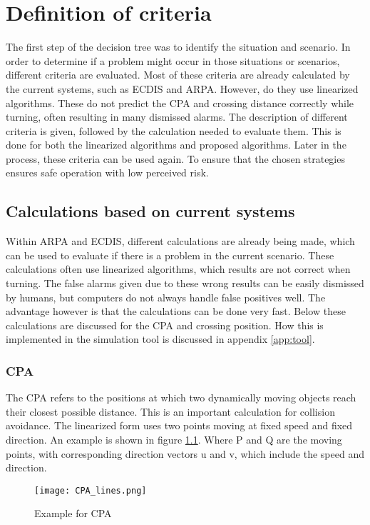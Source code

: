 \chapter{Definition of criteria}
\label{ch:criteria-problem}
The first step of the decision tree was to identify the situation and scenario. In order to determine if a problem might occur in those situations or scenarios, different criteria are evaluated. Most of these criteria are already calculated by the current systems, such as \ac{ECDIS} and \ac{ARPA}. However, do they use linearized algorithms. These do not predict the \ac{CPA} and crossing distance correctly while turning, often resulting in many dismissed alarms. The description of different criteria is given, followed by the calculation needed to evaluate them. This is done for both the linearized algorithms and proposed algorithms. Later in the process, these criteria can be used again. To ensure that the chosen strategies ensures safe operation with low perceived risk.

\section{Calculations based on current systems}
Within \ac{ARPA} and \ac{ECDIS}, different calculations are already being made, which can be used to evaluate if there is a problem in the current scenario. These calculations often use linearized algorithms, which results are not correct when turning. The false alarms given due to these wrong results can be easily dismissed by humans, but computers do not always handle false positives well. The advantage however is that the calculations can be done very fast. Below these calculations are discussed for the \acf{CPA} and crossing position. How this is implemented in the simulation tool is discussed in appendix \ref{app:tool}.

\subsection{\acf{CPA}}
The \ac{CPA} refers to the positions at which two dynamically moving objects reach their closest possible distance. This is an important calculation for collision avoidance. The linearized form uses two points moving at fixed speed and fixed direction. An example is shown in figure \ref{fig:CPA}. Where P and Q are the moving points, with corresponding direction vectors u and v, which include the speed and direction.

\begin{figure}[h]
	\centering
	\texttt{[image: CPA\_lines.png]}
	\caption{Example for \acf{CPA}}
	\label{fig:CPA}
\end{figure}

